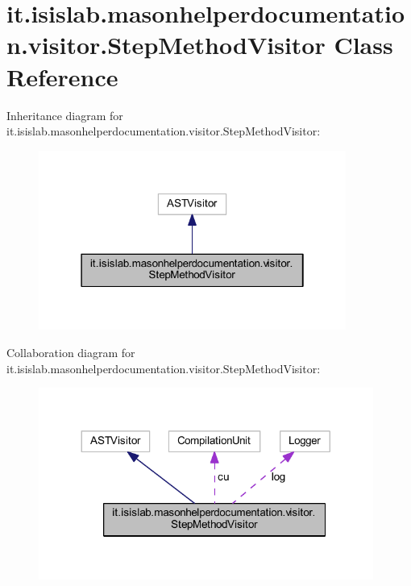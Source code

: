 \hypertarget{classit_1_1isislab_1_1masonhelperdocumentation_1_1visitor_1_1_step_method_visitor}{\section{it.\-isislab.\-masonhelperdocumentation.\-visitor.\-Step\-Method\-Visitor Class Reference}
\label{classit_1_1isislab_1_1masonhelperdocumentation_1_1visitor_1_1_step_method_visitor}
}


Inheritance diagram for it.\-isislab.\-masonhelperdocumentation.\-visitor.\-Step\-Method\-Visitor\-:
\nopagebreak
\begin{figure}[H]
\begin{center}
\leavevmode
\includegraphics[width=286pt]{classit_1_1isislab_1_1masonhelperdocumentation_1_1visitor_1_1_step_method_visitor__inherit__graph}
\end{center}
\end{figure}


Collaboration diagram for it.\-isislab.\-masonhelperdocumentation.\-visitor.\-Step\-Method\-Visitor\-:
\nopagebreak
\begin{figure}[H]
\begin{center}
\leavevmode
\includegraphics[width=311pt]{classit_1_1isislab_1_1masonhelperdocumentation_1_1visitor_1_1_step_method_visitor__coll__graph}
\end{center}
\end{figure}
